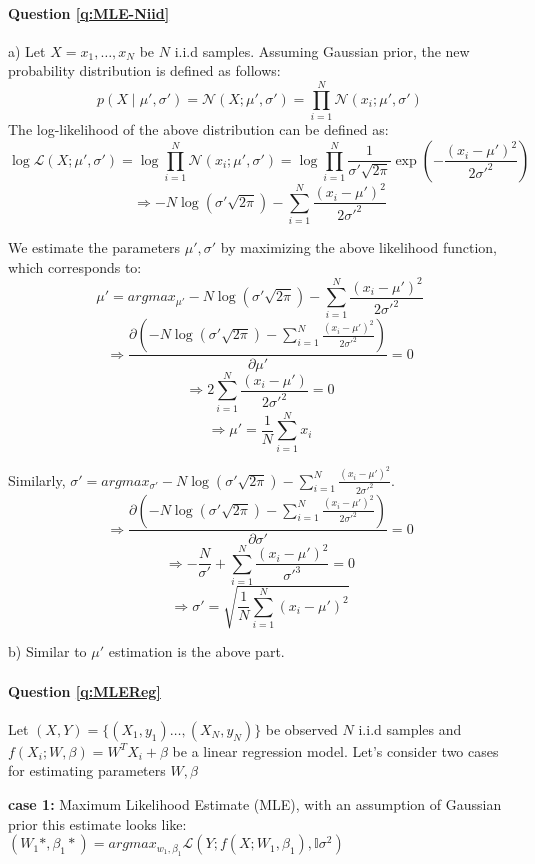 \paragraph{Question \ref{q:MLE-Niid}}
a) 
    Let $X={x_1, \dots, x_N}$ be $N$ i.i.d samples. 
    Assuming Gaussian prior, the new probability distribution is defined as follows:
    $$p(X \mid \mu', \sigma') = \mathcal{N}(X; \mu', \sigma') = \prod_{i=1}^N \mathcal{N}(x_i; \mu', \sigma')$$
    The log-likelihood of the above distribution can be defined as:
    $$\log \mathcal{L}(X; \mu', \sigma') = \log \prod_{i=1}^N \mathcal{N}(x_i; \mu', \sigma') = \log \prod_{i=1}^N \frac{1}{\sigma'\sqrt{2\pi}}\exp(-\frac{(x_i - \mu')^2}{2\sigma'^2})$$
    $$\Rightarrow -N \log (\sigma'\sqrt{2\pi}) - \sum_{i=1}^N \frac{(x_i - \mu')^2}{2\sigma'^2}$$

    We estimate the parameters $\mu', \sigma'$ by maximizing the above likelihood function, which corresponds to:
    $$\mu' = argmax_{\mu'} -N \log (\sigma'\sqrt{2\pi}) - \sum_{i=1}^N \frac{(x_i - \mu')^2}{2\sigma'^2}$$
    $$ \Rightarrow \frac{\partial (-N \log (\sigma'\sqrt{2\pi}) - \sum_{i=1}^N \frac{(x_i - \mu')^2}{2\sigma'^2})}{\partial \mu'} = 0$$
    $$ \Rightarrow  2\sum_{i=1}^N \frac{(x_i - \mu')}{2\sigma'^2} = 0$$
    $$ \Rightarrow \mu' = \frac{1}{N} \sum_{i=1}^N x_i$$

    Similarly, $\sigma' = argmax_{\sigma'} -N \log (\sigma'\sqrt{2\pi}) - \sum_{i=1}^N \frac{(x_i - \mu')^2}{2\sigma'^2}$.
    $$ \Rightarrow \frac{\partial (-N \log (\sigma'\sqrt{2\pi}) - \sum_{i=1}^N \frac{(x_i - \mu')^2}{2\sigma'^2})}{\partial \sigma'} = 0$$
    $$ \Rightarrow -\frac{N}{\sigma'} + \sum_{i=1}^N \frac{(x_i - \mu')^2}{\sigma'^3} = 0$$
    $$ \Rightarrow \sigma' = \sqrt{\frac{1}{N} \sum_{i=1}^N (x_i - \mu')^2}$$

b) Similar to $\mu'$ estimation is the above part.
    
    

\paragraph{Question \ref{q:MLEReg}}

Let $(X,Y)=\{(X_1,y_1) \dots, (X_N, y_N)\}$ be observed $N$ i.i.d samples and $f(X_i; W, \beta) = W^TX_i + \beta$ be a linear regression model.
Let's consider two cases for estimating parameters $W, \beta$

\textbf{case 1:} Maximum Likelihood Estimate (MLE), with an assumption of Gaussian prior this estimate looks like: $(W_1*, \beta_1*) = argmax_{w_1, \beta_1} \mathcal{L}(Y; f(X; W_1, \beta_1), \mathbb{I}\sigma^2)$

